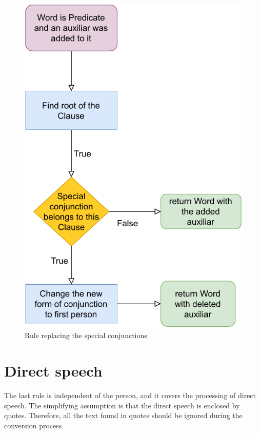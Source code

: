 \begin{figure}[!htbp]
\includegraphics[]{data/Erich-Conjs-Rule.pdf}
\caption{Rule replacing the special conjunctions}
\label{fig:erich-conjs-rule}
\end{figure}


\section{Direct speech}

The last rule is independent of the person, and it covers the processing of direct speech. The simplifying assumption is that the direct speech is enclosed by quotes. Therefore, all the text found in quotes should be ignored during the conversion process.

